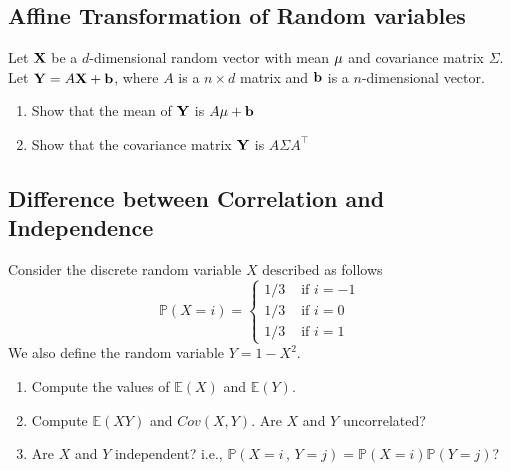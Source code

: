 \subsection{Affine Transformation of Random variables}
Let ${\bf X}$ be a $d$-dimensional random vector with mean ${\bf \mu}$ and covariance matrix  $\Sigma$. Let ${\bf Y} = A{\bf X} + {\bf b}$, where $A$ is a $n \times d$ matrix and ${\bf b}$ is a $n$-dimensional vector.

\begin{enumerate}
    \item Show that the mean of ${\bf Y}$ is $A {\bf \mu } + {\bf b}$
    \item Show that the covariance matrix ${\bf Y}$ is $A \Sigma A^\top$
\end{enumerate}

\subsection{Difference between Correlation and Independence}

Consider the discrete random variable $X$ described as follows
$$ \mathbb{P}(X = i ) = \left\{ \begin{array}{ll} 1/3 & \text{ if } i = -1\\
1/3 & \text{ if } i = 0\\
1/3 & \text{ if } i = 1\end{array}\right.$$
We also define the random variable $Y = 1 - X^2$.

\begin{enumerate}
    \item Compute the values of $\mathbb{E}(X)$ and $\mathbb{E}(Y)$.
    \item Compute $\mathbb{E}(XY)$ and $Cov(X,Y)$. Are $X$ and $Y$ uncorrelated?
    \item Are $X$ and $Y$ independent? i.e., $\mathbb{P}(X = i\, , \, Y=j) = \mathbb{P}(X = i) \mathbb{P}(Y =j)$?
\end{enumerate}





